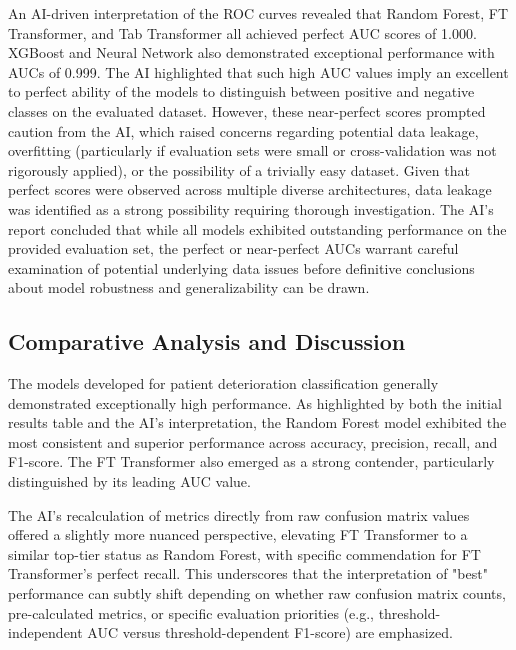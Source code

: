 An AI-driven interpretation of the ROC curves revealed that Random Forest, FT Transformer, and Tab Transformer all achieved perfect AUC scores of 1.000. XGBoost and Neural Network also demonstrated exceptional performance with AUCs of 0.999. The AI highlighted that such high AUC values imply an excellent to perfect ability of the models to distinguish between positive and negative classes on the evaluated dataset. However, these near-perfect scores prompted caution from the AI, which raised concerns regarding potential data leakage, overfitting (particularly if evaluation sets were small or cross-validation was not rigorously applied), or the possibility of a trivially easy dataset. Given that perfect scores were observed across multiple diverse architectures, data leakage was identified as a strong possibility requiring thorough investigation. The AI's report concluded that while all models exhibited outstanding performance on the provided evaluation set, the perfect or near-perfect AUCs warrant careful examination of potential underlying data issues before definitive conclusions about model robustness and generalizability can be drawn.

\subsection{Comparative Analysis and Discussion}

The models developed for patient deterioration classification generally demonstrated exceptionally high performance. As highlighted by both the initial results table and the AI's interpretation, the Random Forest model exhibited the most consistent and superior performance across accuracy, precision, recall, and F1-score. The FT Transformer also emerged as a strong contender, particularly distinguished by its leading AUC value.

The AI's recalculation of metrics directly from raw confusion matrix values offered a slightly more nuanced perspective, elevating FT Transformer to a similar top-tier status as Random Forest, with specific commendation for FT Transformer's perfect recall. This underscores that the interpretation of "best" performance can subtly shift depending on whether raw confusion matrix counts, pre-calculated metrics, or specific evaluation priorities (e.g., threshold-independent AUC versus threshold-dependent F1-score) are emphasized.

